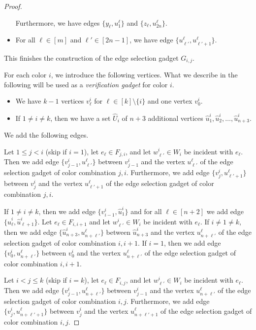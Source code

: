 \documentclass[11pt,a4paper]{article}
\theoremstyle{remark}
\theoremstyle{definition}
\begin{document}
\begin{proof}
\begin{itemize}
        Furthermore, we have edges $\{y_\ell,u^\ell_1\}$ and $\{z_\ell,u^\ell_{2n}\}$.
        \item For all $\ell\in [m]$ and $\ell'\in [2n-1]$, we have edge $\{u^\ell_{\ell'},u^\ell_{\ell'+1}\}$.
    \end{itemize}
    This finishes the construction of the edge selection gadget $G_{i,j}$.

    For each color $i$, we introduce the following vertices. What we describe in the following will be used as a \emph{verification gadget} for color $i$.
    \begin{itemize}
        \item We have $k-1$ vertices $v^i_\ell$ for $\ell\in[k]\setminus\{i\}$ and one vertex $v^i_0$.
        \item If $1\neq i\neq k$, then we have a set $\hat{U}_i$ of $n+3$ additional vertices $\hat{u}^i_1,\hat{u}^i_2,\ldots,\hat{u}^i_{n+3}$.
    \end{itemize}
    We add the following edges. 
    
    Let $1\le j<i$ (skip if $i=1$), let $e_\ell\in F_{j,i}$, and let $w^i_{\ell'}\in W_i$ be incident with $e_\ell$. Then we add edge $\{v_{j-1}^i,u^\ell_{\ell'}\}$ between $v^i_{j-1}$ and the vertex $u^\ell_{\ell'}$ of the edge selection gadget of color combination $j,i$.
    Furthermore, we add edge $\{v_{j}^i,u^\ell_{\ell'+1}\}$ between $v^i_j$ and the vertex $u^\ell_{\ell'+1}$ of the edge selection gadget of color combination $j,i$.

    If $1\neq i\neq k$, then we add edge $\{v^i_{i-1},\hat{u}^i_1\}$ and for all $\ell\in[n+2]$ we add edge $\{\hat{u}^i_\ell,\hat{u}^i_{\ell+1}\}$. 
    Let $e_\ell\in F_{i,i+1}$ and let $w^i_{\ell'}\in W_i$ be incident with $e_\ell$. If $i\neq 1\neq k$, then we add edge $\{\hat{u}^i_{n+3},u^\ell_{n+\ell'}\}$ between $\hat{u}^i_{n+3}$ and the vertex $u^\ell_{n+\ell'}$ of the edge selection gadget of color combination $i,i+1$. If $i=1$, then we add edge $\{v^i_0,u^\ell_{n+\ell'}\}$ between $v^i_0$ and the vertex $u^\ell_{n+\ell'}$ of the edge selection gadget of color combination $i,i+1$.

    Let $i<j\le k$ (skip if $i=k$), let $e_\ell\in F_{i,j}$, and let $w^i_{\ell'}\in W_i$ be incident with $e_\ell$. Then we add edge $\{v_{j-1}^i,u^\ell_{n+\ell'}\}$ between $v^i_{j-1}$ and the vertex $u^\ell_{n+\ell'}$ of the edge selection gadget of color combination $i,j$.
    Furthermore, we add edge $\{v_{j}^i,u^\ell_{n+\ell'+1}\}$ between $v^i_j$ and the vertex $u^\ell_{n+\ell'+1}$ of the edge selection gadget of color combination $i,j$.



\end{proof}
\end{document}
